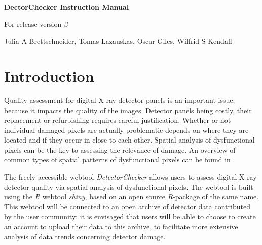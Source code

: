 \documentclass[11pt,a4paper,twosided]{article}
\newcommand{\DetectorChecker}{\emph{DetectorChecker}\xspace}
\newcommand{\Rsoftware}{\emph{R}\xspace}
\begin{document}


\begin{center}

{\Large\bf DectorChecker Instruction Manual}

\bigskip
{\Large For release version $\beta$}

\bigskip
{\large Julia A Brettschneider, Tomas Lazauskas, Oscar Giles, Wilfrid S Kendall}



\medskip
\end{center}




\section{Introduction}\label{int}

Quality assessment for digital X-ray detector panels is an important issue, because
it impacts the quality of the images. 
Detector panels being costly, 
their replacement or refurbishing requires careful justification.
Whether or not individual damaged pixels are actually 
problematic depends on where they are located and if they occur in close to each other.
Spatial analysis of dysfunctional pixels can be the key to assessing the relevance of damage.
An overview of 
common
types of spatial patterns of dysfunctional pixels can be found in  
\cite{brettschneider2014crism}. 

The freely accessible webtool \DetectorChecker allows users to assess digital X-ray 
detector quality via spatial analysis of dysfunctional pixels.
The webtool is built using the \Rsoftware webtool \emph{shiny}, based on an open source \Rsoftware-package of the same name.
This webtool will be
connected to an open archive of detector data contributed by the user community:
it is envisaged that users will be able to choose to create an account to upload their data to this archive,
to facilitate more extensive analysis of data trends concerning detector damage.
\end{document}
